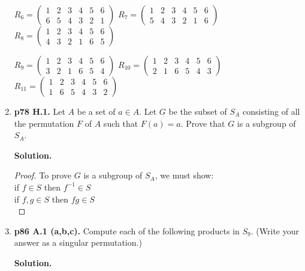 \documentclass[11pt]{article}
\begin{document}
\begin{enumerate}
	$R_6 = \begin{pmatrix}
		1 & 2 & 3 & 4 & 5 & 6 \\
		6 & 5 & 4 & 3 & 2 & 1
	\end{pmatrix}$
	$R_7 = \begin{pmatrix}
		1 & 2 & 3 & 4 & 5 & 6 \\
		5 & 4 & 3 & 2 & 1 & 6
	\end{pmatrix}$
	$R_8 = \begin{pmatrix}
		1 & 2 & 3 & 4 & 5 & 6 \\
		4 & 3 & 2 & 1 & 6 & 5
	\end{pmatrix}$
	
	$R_9 = \begin{pmatrix}
		1 & 2 & 3 & 4 & 5 & 6 \\
		3 & 2 & 1 & 6 & 5 & 4
	\end{pmatrix}$
	$R_{10} = \begin{pmatrix}
		1 & 2 & 3 & 4 & 5 & 6 \\
		2 & 1 & 6 & 5 & 4 & 3
	\end{pmatrix}$
	$R_{11} = \begin{pmatrix}
		1 & 2 & 3 & 4 & 5 & 6 \\
		1 & 6 & 5 & 4 & 3 & 2
	\end{pmatrix}$

\item {\bfseries p78 H.1.} Let $A$ be a set of $a \in A$. Let $G$ be the subset of $S_A$ consisting of all the permutation $F$ of $A$ such that $F(a) = a$. Prove that $G$ is a subgroup of $S_A$.
  
	{\bfseries Solution.}
	
	\begin{proof}
	To prove $G$ is a subgroup of $S_A$, we must show: \\
	if $f \in S$ then $f^{-1} \in S$ \\
	if $f,g \in S$ then $fg \in S$ \\
	
	
	\end{proof}
  
\newpage

\item {\bfseries p86 A.1 (a,b,c).} Compute each of the following products in $S_9$. (Write your answer as a singular permutation.)
  
	{\bfseries Solution.}
	
	\begin{enumerate}
  

\end{enumerate}
\end{enumerate}
\end{document}
